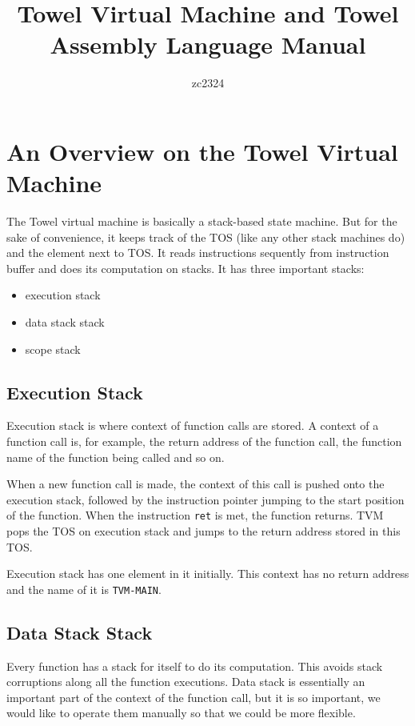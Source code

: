 \documentclass{article}
\title{Towel Virtual Machine and Towel Assembly Language Manual}
\author{zc2324}
\begin{document}
\maketitle
\tableofcontents

\section{An Overview on the Towel Virtual Machine}

The Towel virtual machine is basically a stack-based state machine. But for the sake of convenience, it keeps track of the TOS (like any other stack machines do) and the element next to TOS. It reads instructions sequently from instruction buffer and does its computation on stacks. It has three important stacks:
\begin{itemize}
\item execution stack
\item data stack stack
\item scope stack
\end{itemize}

\subsection{Execution Stack}

Execution stack is where context of function calls are stored. A context of a function call is, for example, the return address of the function call, the function name of the function being called and so on.

When a new function call is made, the context of this call is pushed onto the execution stack, followed by the instruction pointer jumping to the start position of the function. When the instruction \texttt{ret} is met, the function returns. TVM pops the TOS on execution stack and jumps to the return address stored in this TOS.

Execution stack has one element in it initially. This context has no return address and the name of it is \texttt{TVM-MAIN}.

\subsection{Data Stack Stack}

Every function has a stack for itself to do its computation. This avoids stack corruptions along all the function executions. Data stack is essentially an important part of the context of the function call, but it is so important, we would like to operate them manually so that we could be more flexible.
\end{document}
